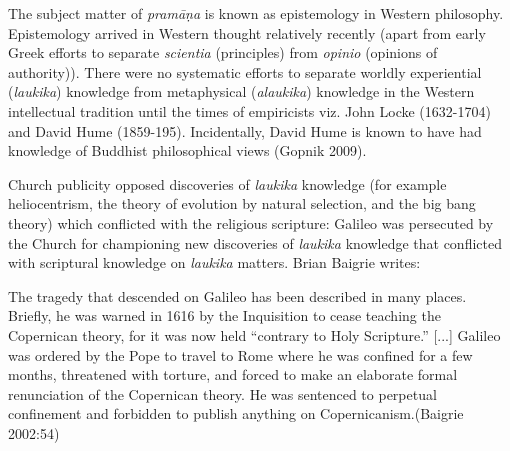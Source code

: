 The subject matter of {\sl pramāṇa} is known as epistemology in Western philosophy.  Epistemology arrived in Western thought relatively recently (apart from early Greek efforts to separate {\sl scientia} (principles) from {\sl opinio} (opinions of authority)). There were no systematic efforts to separate worldly experiential ({\sl laukika}) knowledge from metaphysical ({\sl alaukika}) knowledge in the Western intellectual tradition until the times of empiricists viz. John Locke (1632-1704) and David Hume (1859-195).  Incidentally, David Hume is known to have had knowledge of Buddhist philosophical views (Gopnik 2009).

Church publicity opposed discoveries of {\sl laukika} knowledge (for example heliocentrism, the theory of evolution by natural selection, and the big bang theory) which conflicted with the religious scripture: Galileo was persecuted by the Church for championing new discoveries of {\sl laukika} knowledge that conflicted with scriptural knowledge on {\sl laukika} matters.  Brian Baigrie writes:
\begin{myquote}
The tragedy that descended on Galileo has been described in many places. Briefly, he was warned in 1616 by the Inquisition to cease teaching the Copernican theory, for it was now held ``contrary to Holy Scripture.'' [...] Galileo was ordered by the Pope to travel to Rome where he was confined for a few months, threatened with torture, and forced to make an elaborate formal renunciation of the Copernican theory.  He was sentenced to perpetual confinement and forbidden to publish anything on Copernicanism.\hfill (Baigrie 2002:54)
\end{myquote}

